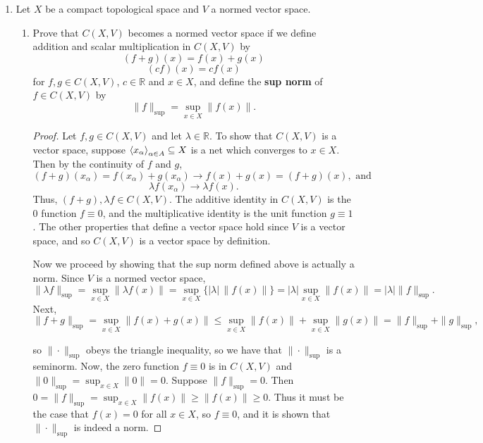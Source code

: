 \documentclass[11pt,oneside,english]{amsart}
\theoremstyle{definition}
\newcommand{\MB}[1]{\mathbb{#1}}
\def\<#1>{\mathinner{\langle#1\rangle}}
\begin{document}
\rightline{\today}



\vspace{5mm}
\begin{enumerate}
\itemsep7mm





\item Let $X$ be a compact topological space and $V$ a normed vector space.

\begin{enumerate}
\itemsep7mm
\item Prove that $C(X,V)$ becomes a normed vector space if we define addition and scalar multiplication in $C(X,V)$ by
\[         (f + g)(x) = f(x) + g(x)   \]
\[        (c f)(x) = c f(x)   \]
for $f,g \in C(X,V)$, $c \in \MB{R}$ and $x \in X$, and define the \textbf{sup norm} of $f \in C(X,V)$ by
\[          \|f\|_{\sup} = \sup_{x \in X} \|f(x)\|.    \]

\begin{proof}
Let $f,g\in C(X,V)$ and let $\lambda\in \MB{R}$. To show that $C(X,V)$ is a vector space, suppose $\<x_\alpha>_{\alpha\in A}\subseteq X$ is a net which converges to $x\in X$. Then by the continuity of $f$ and $g$, 
\[
(f+g)(x_\alpha)=f(x_\alpha)+g(x_\alpha)\rightarrow f(x)+g(x)=(f+g)(x),\text{ and}
\]
\[
\lambda f(x_\alpha)\rightarrow \lambda f(x).
\]
Thus, $(f+g),\lambda f\in C(X,V)$. The additive identity in $C(X,V)$ is the 0 function $f\equiv 0$, and the multiplicative identity is the unit function $g\equiv 1$. The other properties that define a vector space hold since $V$ is a vector space, and so $C(X,V)$ is a vector space by definition.

Now we proceed by showing that the sup norm defined above is actually a norm. Since $V$ is a normed vector space, 
\[
\|\lambda f\|_{\sup}=\sup_{x\in X}\|\lambda f(x)\|=\sup_{x\in X}\{|\lambda|\,\|f(x)\|\}=|\lambda|\sup_{x\in X}\|f(x)\|=|\lambda|\|f\|_{\sup}.
\]
Next,
\[
\|f+g\|_{\sup}=\sup_{x\in X}\|f(x)+g(x)\|\leq \sup_{x\in X}\|f(x)\|+\sup_{x\in X}\|g(x)\|=\|f\|_{\sup}+\|g\|_{\sup},
\]

so $\|\cdot\|_{\sup}$ obeys the triangle inequality, so we have that $\|\cdot\|_{\sup}$ is a seminorm. Now, the zero function $f\equiv 0$ is in $C(X,V)$ and $\|0\|_{\sup}=\sup_{x\in X}\|0\|=0$. Suppose $\|f\|_{\sup}=0$. Then $0=\|f\|_{\sup}=\sup_{x\in X}\|f(x)\|\geq\|f(x)\|\geq 0$. Thus it must be the case that $f(x)=0$ for all $x\in X$, so $f\equiv 0$, and it is shown that $\|\cdot\|_{\sup}$ is indeed a norm.
\end{proof}


\end{enumerate}
\end{enumerate}
\end{document}
